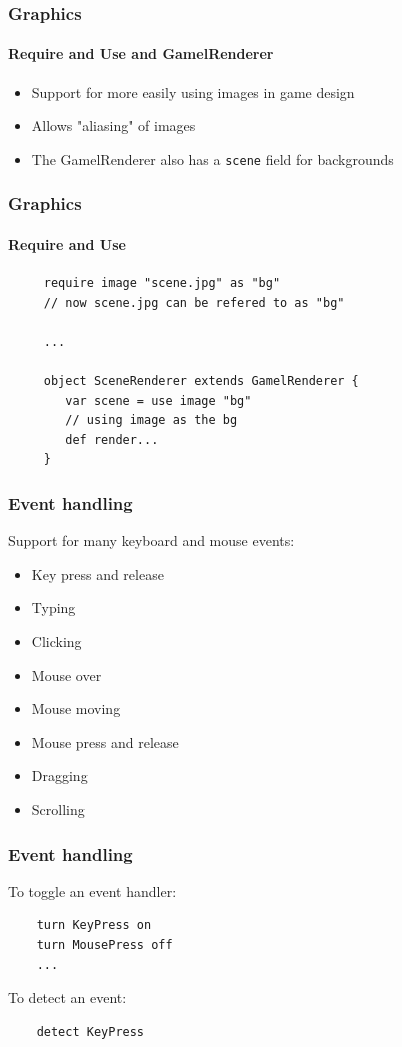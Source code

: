 \documentclass{beamer}
\begin{document}
\begin{frame}
    \frametitle{Graphics}
    \framesubtitle{Require and Use and GamelRenderer}
    \begin{itemize}[<+->]
        \item{Support for more easily using images in game design}
        \item{Allows "aliasing" of images}
        \item{The GamelRenderer also has a \texttt{scene} field for backgrounds}
    \end{itemize}
\end{frame}

\begin{frame}[fragile]
    \frametitle{Graphics}
    \framesubtitle{Require and Use}
    \begin{lstlisting}
     require image "scene.jpg" as "bg"
     // now scene.jpg can be refered to as "bg"

     ...

     object SceneRenderer extends GamelRenderer {
        var scene = use image "bg"
        // using image as the bg
        def render...
     }
    \end{lstlisting}
\end{frame}

\begin{frame}
    \frametitle{Event handling}
    Support for many keyboard and mouse events:
    \begin{multicols}{2}
    \begin{itemize}[<+->]
        \item{Key press and release}
        \item{Typing}
        \item{Clicking}
        \item{Mouse over}
        \item{Mouse moving}
        \item{Mouse press and release}
        \item{Dragging}
        \item{Scrolling}
    \end{itemize}
    \end{multicols}
\end{frame}

\begin{frame}[fragile]
    \frametitle{Event handling}
    To toggle an event handler:
    \begin{lstlisting}
    turn KeyPress on
    turn MousePress off
    ...
    \end{lstlisting}

    To detect an event:
    \begin{lstlisting}
    detect KeyPress
    \end{lstlisting}
\end{frame}
\end{document}

